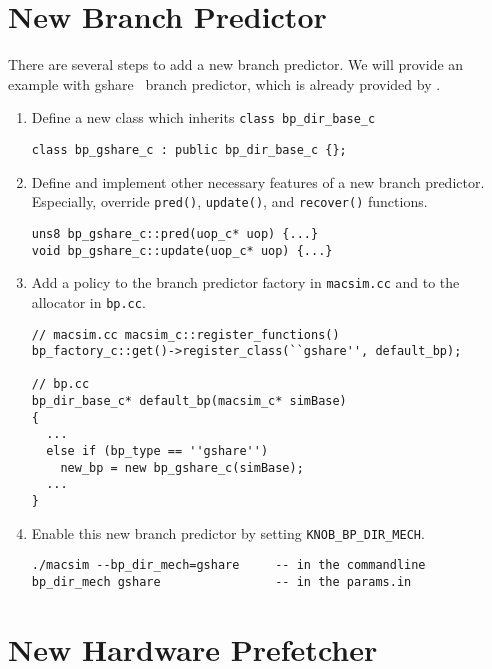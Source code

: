 \section{New Branch Predictor}


There are several steps to add a new branch predictor. We will provide
an example with gshare~\cite{mcf93} branch predictor, which is already
provided by \SIM.

\begin{enumerate}[Step 1.]
  \item Define a new class which inherits \Verb+class bp_dir_base_c+
\begin{Verbatim}
class bp_gshare_c : public bp_dir_base_c {};
\end{Verbatim}

  \item Define and implement other necessary features of a new branch
    predictor. Especially, override \Verb+pred()+, \Verb+update()+,
    and \Verb+recover()+ functions.
\begin{Verbatim}
uns8 bp_gshare_c::pred(uop_c* uop) {...}
void bp_gshare_c::update(uop_c* uop) {...}

\end{Verbatim}

  \item Add a policy to the branch predictor factory in
    \Verb+macsim.cc+ and to the allocator in \Verb+bp.cc+.

\begin{Verbatim}
// macsim.cc macsim_c::register_functions()
bp_factory_c::get()->register_class(``gshare'', default_bp);

// bp.cc
bp_dir_base_c* default_bp(macsim_c* simBase)
{
  ...
  else if (bp_type == ''gshare'')
    new_bp = new bp_gshare_c(simBase);
  ...
}
\end{Verbatim}

  \item Enable this new branch predictor by setting \Verb+KNOB_BP_DIR_MECH+.
\begin{Verbatim}
./macsim --bp_dir_mech=gshare     -- in the commandline
bp_dir_mech gshare                -- in the params.in
\end{Verbatim}
\end{enumerate}


\section{New Hardware Prefetcher}


